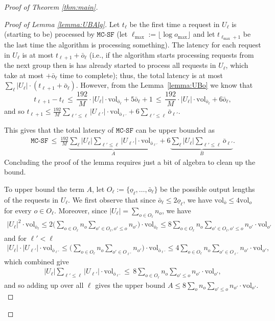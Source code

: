 \documentclass[11pt, a4paper]{article}
\theoremstyle{plain}
\theoremstyle{definition}
\theoremstyle{remark}
\newcommand{\mcsdf}{\texttt{MC-SF}}
\newcommand{\vol}{\textrm{vol}}
\newcommand{\alg}{\mcsdf}
\begin{document}
\begin{proof}[Proof of Theorem \ref{thm:main}]
\begin{proof}[Proof of Lemma \ref{lemma:UBAlg}]
	Let $t_\ell$ be the first time a request in $U_\ell$ is (starting to be) processed by $\alg$ (let $\ell_{\max} := \lfloor \log o_{\max} \rfloor$ and let $t_{\ell_{\max} + 1}$ be the last time the algorithm is processing something). The latency for each request in $U_\ell$ is at most {$t_{\ell+1} + \bar{o}_\ell$} (i.e., if the algorithm starts processing requests from the next group then is has already started to process all requests in $U_\ell$, which take at most $+ \bar{o}_\ell$ time to complete); thus, the total latency is at most $\sum_\ell |U_\ell| \cdot ({t_{\ell+1} + \bar{o}_\ell})$. However, from the Lemma~\ref{lemma:UBo} we know that $$t_{\ell+1} - t_{\ell} \,\le\, \frac{192}{M} \cdot |U_\ell| \cdot \vol_{\bar{o}_\ell} + 5\bar{o}_\ell + 1 \,\le\, \frac{192}{M} \cdot |U_\ell| \cdot \vol_{\bar{o}_\ell} + 6\bar{o}_\ell,$$ and so $t_{\ell + 1} \le \frac{192}{M} \sum_{\ell' \le \ell} |U_{\ell'}| \cdot \vol_{\bar{o}_{\ell'}} + 6 \sum_{\ell' \le \ell} \bar{o}_{\ell'}$.
    
    This gives that the total latency of $\alg$ can be upper bounded as 
	\begin{align}
		\alg \,\le\, \frac{192}{M} \underbrace{\sum_\ell |U_\ell| \sum_{\ell' \le \ell} |U_{\ell'}| \cdot \vol_{\bar{o}_{\ell'}}}_{A} + 6 \underbrace{\sum_\ell |U_\ell| \sum_{\ell' \le \ell} \bar{o}_{\ell'}}_{B}.  \label{eq:UBAlg}
	\end{align}
	Concluding the proof of the lemma requires just a bit of algebra to clean up the bound. 
	
	To upper bound the term $A$, let $O_\ell := \{\underline{o}_\ell, \ldots, \bar{o}_\ell\}$ be the possible output lengths of the requests in $U_\ell$. We first observe that since $\bar{o}_{\ell} \le 2\underline{o}_\ell$, we have $\vol_{\bar{o}} \le 4 \vol_o$ for every $o \in O_\ell$. Moreover, since $|U_\ell| = \sum_{o \in O_\ell} n_o$, we have 
	\begin{gather*}
	|U_\ell|^2 \cdot \vol_{\bar{o}_\ell} \le 2 \bigg(\sum_{o \in O_\ell} n_o \sum_{o' \in O_\ell, o' \le o} n_{o'}\bigg) \cdot  \vol_{\bar{o}_\ell} \le  8 \sum_{o \in O_\ell} n_o \sum_{o' \in O_\ell, o' \le o} n_{o'} \cdot  \vol_{o'}
	\end{gather*}
	and for $\ell' < \ell$ 
	\begin{gather*}
	|U_\ell| \cdot |U_{\ell'}| \cdot \vol_{\bar{o}_{\ell'}} \le \bigg(\sum_{o \in O_\ell} n_o \sum_{o' \in O_{\ell'}} n_{o'}\bigg) \cdot  \vol_{\bar{o}_{\ell'}} \le  4 \sum_{o \in O_\ell} n_o \sum_{o' \in O_{\ell'}} n_{o'} \cdot  \vol_{o'},
	\end{gather*}	
	which combined give
	\begin{gather*}
	|U_\ell| \sum_{\ell' \le \ell} |U_{\ell'}| \cdot \vol_{\bar{o}_{\ell'}} \,\le\, 8  \sum_{o \in O_\ell} n_o \sum_{o' \le o} n_{o'} \cdot  \vol_{o'},
	\end{gather*}	
	and so adding up over all $\ell$ gives the upper bound $A \le 8 \sum_o n_o \sum_{o' \le o} n_{o'} \cdot  \vol_{o'}.$
	

\end{proof}
\end{proof}
\end{document}
